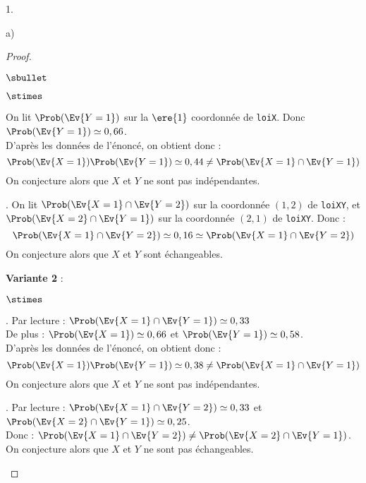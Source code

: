 \documentclass[11pt]{article}%
\begin{document}
\begin{noliste}{1.}
\begin{noliste}{a)}
\begin{proof}
\begin{noliste}{$\sbullet$}
\begin{noliste}{$\stimes$}
    \newpage

    
    On lit $\Prob(\Ev{Y=1})$ sur la $\ere{1}$ coordonnée de 
    \texttt{loiX}. Donc $\Prob(\Ev{Y=1}) \simeq 0,66$.\\[.2cm]
    D'après les données de l'énoncé, on obtient donc :
    \[
     \Prob(\Ev{X=1}) \Prob(\Ev{Y=1}) \simeq 0,44 \neq 
     \Prob(\Ev{X=1} \cap \Ev{Y=1})
    \]
    On conjecture alors que $X$ et $Y$ ne sont pas indépendantes.
    
    \item {}.
    On lit $\Prob(\Ev{X=1} \cap \Ev{Y=2})$ sur la coordonnée $(1,2)$ 
    de \texttt{loiXY}, et \\[.2cm]
    $\Prob(\Ev{X=2} \cap \Ev{Y=1})$ sur la 
    coordonnée $(2,1)$ de \texttt{loiXY}. Donc :
    \[
     \Prob(\Ev{X=1} \cap \Ev{Y=2}) \simeq 
    0,16 \simeq \Prob(\Ev{X=1} \cap \Ev{Y=2})
    \]
    On conjecture alors que $X$ et $Y$ sont échangeables.
    \end{noliste}
    
    \item {\bf Variante 2} :
    \begin{noliste}{$\stimes$}
    \item {}. Par lecture : $\Prob(\Ev{X=1} \cap 
    \Ev{Y=1}) \simeq 0,33$\\[.2cm]
    De plus : $\Prob(\Ev{X=1}) \simeq 0,66$ et $\Prob(\Ev{Y=1}) \simeq 
    0,58$.\\[.2cm]
    D'après les données de l'énoncé, on obtient donc :
    \[
     \Prob(\Ev{X=1}) \Prob(\Ev{Y=1}) \simeq 0,38 \neq 
     \Prob(\Ev{X=1} \cap \Ev{Y=1})
    \]
    On conjecture alors que $X$ et $Y$ ne sont pas indépendantes.
    
    \item {}. Par lecture :
    $\Prob(\Ev{X=1}\cap \Ev{Y=2}) \simeq 0,33$ et
    $\Prob(\Ev{X=2} \cap \Ev{Y=1}) \simeq 0,25$.\\[.2cm]
    Donc : $\Prob(\Ev{X=1}\cap \Ev{Y=2}) \neq 
    \Prob(\Ev{X=2}\cap \Ev{Y=1})$.\\[.2cm]
    On conjecture alors que $X$ et $Y$ ne sont pas échangeables.
    \end{noliste}
    

\end{noliste}
\end{proof}
\end{noliste}
\end{noliste}
\end{document}
